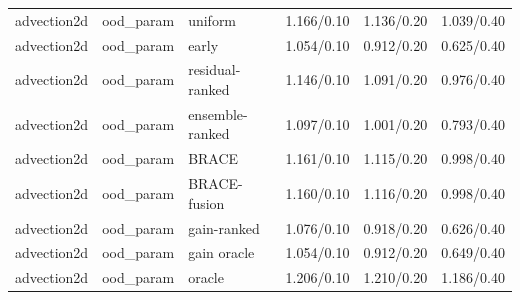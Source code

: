 \begin{tabular}{lllrrr}
advection2d & ood\_param & uniform & 1.166/0.10 & 1.136/0.20 & 1.039/0.40 \\
advection2d & ood\_param & early & 1.054/0.10 & 0.912/0.20 & 0.625/0.40 \\
advection2d & ood\_param & residual-ranked & 1.146/0.10 & 1.091/0.20 & 0.976/0.40 \\
advection2d & ood\_param & ensemble-ranked & 1.097/0.10 & 1.001/0.20 & 0.793/0.40 \\
advection2d & ood\_param & BRACE & 1.161/0.10 & 1.115/0.20 & 0.998/0.40 \\
advection2d & ood\_param & BRACE-fusion & 1.160/0.10 & 1.116/0.20 & 0.998/0.40 \\
advection2d & ood\_param & gain-ranked & 1.076/0.10 & 0.918/0.20 & 0.626/0.40 \\
advection2d & ood\_param & gain oracle & 1.054/0.10 & 0.912/0.20 & 0.649/0.40 \\
advection2d & ood\_param & oracle & 1.206/0.10 & 1.210/0.20 & 1.186/0.40 \\
\midrule
\bottomrule
\end{tabular}
